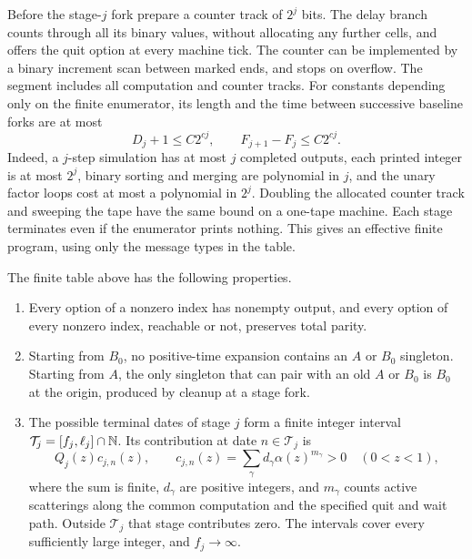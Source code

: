 Before the stage-\(j\) fork prepare a counter track of \(2^j\) bits. The delay branch counts through all its binary values, without allocating any further cells, and offers the quit option at every machine tick. The counter can be implemented by a binary increment scan between marked ends, and stops on overflow. The segment includes all computation and counter tracks. For constants depending only on the finite enumerator, its length and the time between successive baseline forks are at most
\begin{equation}\label{eq:fork-cost}
 D_j+1\le C2^{cj},\qquad F_{j+1}-F_j\le C2^{cj}.
\end{equation}
Indeed, a \(j\)-step simulation has at most \(j\) completed outputs, each printed integer is at most \(2^j\), binary sorting and merging are polynomial in \(j\), and the unary factor loops cost at most a polynomial in \(2^j\). Doubling the allocated counter track and sweeping the tape have the same bound on a one-tape machine. Each stage terminates even if the enumerator prints nothing. This gives an effective finite program, using only the message types in the table.

\begin{lemma}\label{lem:dual-table}
The finite table above has the following properties.
\begin{enumerate}[label=\textup{(\roman*)}]
\item Every option of a nonzero index has nonempty output, and every option of every nonzero index, reachable or not, preserves total parity.
\item Starting from \(B_0\), no positive-time expansion contains an \(A\) or \(B_0\) singleton. Starting from \(A\), the only singleton that can pair with an old \(A\) or \(B_0\) is \(B_0\) at the origin, produced by cleanup at a stage fork.
\item The possible terminal dates of stage \(j\) form a finite integer interval \(\mathcal T_j=[f_j,\ell_j]\cap\mathbb N\). Its contribution at date \(n\in\mathcal T_j\) is
\begin{equation}\label{eq:terminal-coefficient}
 Q_j(z)c_{j,n}(z),\qquad
 c_{j,n}(z)=\sum_{\gamma} d_\gamma\alpha(z)^{m_\gamma}>0
 \quad(0<z<1),
\end{equation}
where the sum is finite, \(d_\gamma\) are positive integers, and \(m_\gamma\) counts active scatterings along the common computation and the specified quit and wait path. Outside \(\mathcal T_j\) that stage contributes zero. The intervals cover every sufficiently large integer, and \(f_j\to\infty\).
\end{enumerate}
\end{lemma}

